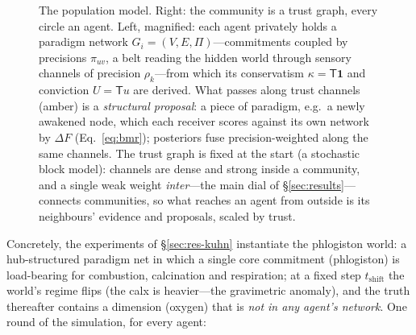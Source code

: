 \documentclass[11pt]{article}
\newcommand{\Top}{\mathsf{T}}          %
\newcommand{\bone}{\mathbf{1}}         %
\begin{document}
\begin{figure}[h!]
{}
\caption{The population model. Right: the community is a trust graph, every circle an agent. Left,
magnified: each agent privately holds a paradigm network $G_i=(V,E,\Pi)$---commitments coupled by
precisions $\pi_{uv}$, a belt reading the hidden world through sensory channels of precision
$\rho_k$---from which its conservatism $\kappa=\Top\bone$ and conviction $U=\Top u$ are derived. What
passes along trust channels (amber) is a \emph{structural proposal}: a piece of paradigm, e.g.\ a
newly awakened node, which each receiver scores against its own network by $\Delta F$
(Eq.~\ref{eq:bmr}); posteriors fuse precision-weighted along the same channels. The trust graph is
fixed at the start (a stochastic block model): channels are dense and strong inside a community, and
a single weak weight \emph{inter}---the main dial of \S\ref{sec:results}---connects communities, so
what reaches an agent from outside is its neighbours' evidence and proposals, scaled by trust.}
\label{fig:population}
\end{figure}

Concretely, the experiments of \S\ref{sec:res-kuhn} instantiate the phlogiston world: a hub-structured
paradigm net in which a single core commitment (phlogiston) is load-bearing for combustion,
calcination and respiration; at a fixed step $t_{\mathrm{shift}}$ the world's regime flips (the calx
is heavier---the gravimetric anomaly), and the truth thereafter contains a dimension (oxygen) that is
\emph{not in any agent's network}. One round of the simulation, for every agent:
\end{document}
